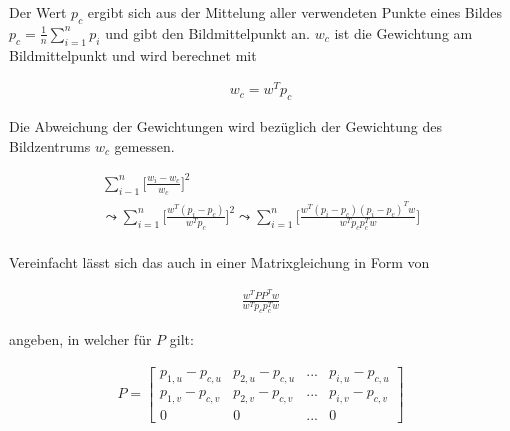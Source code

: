 %
 
Der Wert $p_c$ ergibt sich aus der Mittelung aller verwendeten Punkte eines Bildes $p_c = \frac{1}{n} \sum_{i=1}^{n} p_i$ und gibt den Bildmittelpunkt an. $w_c$ ist die Gewichtung am Bildmittelpunkt und wird berechnet mit

\begin{gather}
	w_c = w^Tp_c
\end{gather}


Die Abweichung der Gewichtungen wird bezüglich der Gewichtung des Bildzentrums $w_c$ gemessen. 

\begin{gather}
	\sum_{i-1}^{n}\Big[\frac{w_i-w_c}{w_c} \Big]^2\\
	\leadsto \sum_{i=1}^{n}\Big[\frac{w^T (p_i-p_c)}{w^Tp_c} \Big]^2
	\leadsto \sum_{i=1}^{n}\Big[\frac{w^T (p_i-p_c)(p_i-p_c)^Tw}{w^Tp_cp_c^Tw} \Big]
\end{gather}\\

%

Vereinfacht lässt sich das auch in einer Matrixgleichung in Form von

\begin{gather}
	\frac{w^TPP^Tw}{w^Tp_cp_c^Tw} \label{eq:MinimizationBild1}
\end{gather}

angeben, in welcher für $P$ gilt:

\begin{gather}
	P=\begin{bmatrix}
		p_{1,u}-p_{c,u}&p_{2,u}-p_{c,u}&...&p_{i,u}-p_{c,u}\\
		p_{1,v}-p_{c,v}&p_{2,v}-p_{c,v}&...&p_{i,v}-p_{c,v}\\\label{eq:P}
		0&0&...&0	
	\end{bmatrix}
\end{gather}


